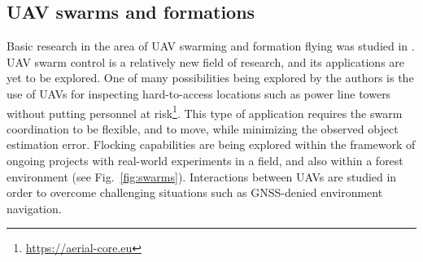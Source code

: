 \documentclass[a4paper,11pt,titlepage,twoside]{book}
\newcommand{\reffig}[1]{Fig.~\ref{#1}}
\begin{document}
  \subsection{UAV swarms and formations}
  \label{sec:uav_swarms_and_formations}

  Basic research in the area of \ac{UAV} swarming and formation flying was studied in \cite{saska2020formation, saska2016formations, saska2019large}.
  UAV swarm control is a relatively new field of research, and its applications are yet to be explored.
  One of many possibilities being explored by the authors is the use of \acp{UAV} for inspecting hard-to-access locations such as power line towers without putting personnel at risk\footnote{\url{https://aerial-core.eu}}.
  This type of application requires the swarm coordination to be flexible, and to move, while minimizing the observed object estimation error.
  Flocking capabilities are being explored within the framework of ongoing projects with real-world experiments in a field, and also within a forest environment (see \reffig{fig:swarms}).
  Interactions between \acp{UAV} are studied in order to overcome challenging situations such as GNSS-denied environment navigation.
\end{document}
